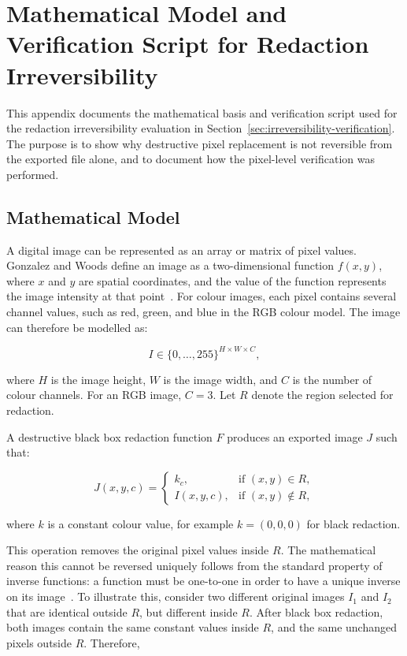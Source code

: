 
\chapter{Mathematical Model and Verification Script for Redaction Irreversibility}
\label{app:redaction_irreversibility}

This appendix documents the mathematical basis and verification script used for the redaction irreversibility evaluation in Section~\ref{sec:irreversibility-verification}. The purpose is to show why destructive pixel replacement is not reversible from the exported file alone, and to document how the pixel-level verification was performed.

\section{Mathematical Model}

A digital image can be represented as an array or matrix of pixel values. Gonzalez and Woods define an image as a two-dimensional function \(f(x,y)\), where \(x\) and \(y\) are spatial coordinates, and the value of the function represents the image intensity at that point~\cite{gonzalez2018digital}. For colour images, each pixel contains several channel values, such as red, green, and blue in the RGB colour model. The image can therefore be modelled as:

\[
I \in \{0,\ldots,255\}^{H \times W \times C},
\]

where \(H\) is the image height, \(W\) is the image width, and \(C\) is the number of colour channels. For an RGB image, \(C=3\). Let \(R\) denote the region selected for redaction.

A destructive black box redaction function \(F\) produces an exported image \(J\) such that:

\[
J(x,y,c) =
\begin{cases}
k_c, & \text{if } (x,y) \in R, \\
I(x,y,c), & \text{if } (x,y) \notin R,
\end{cases}
\]

where \(k\) is a constant colour value, for example \(k=(0,0,0)\) for black redaction.

This operation removes the original pixel values inside \(R\). The mathematical reason this cannot be reversed uniquely follows from the standard property of inverse functions: a function must be one-to-one in order to have a unique inverse on its image~\cite{rosen2019discrete}. To illustrate this, consider two different original images \(I_1\) and \(I_2\) that are identical outside \(R\), but different inside \(R\). After black box redaction, both images contain the same constant values inside \(R\), and the same unchanged pixels outside \(R\). Therefore,


